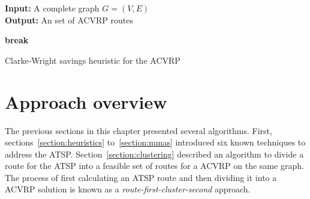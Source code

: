 \begin{algorithm}
  \textbf{Input:} A complete graph $G=(V,E)$ \\
  \textbf{Output:} An set of ACVRP routes
  \begin{algorithmic}[1]

      \ENDFOR
    \ENDFOR


          \ENDIF
        \ENDIF
      \ELSE
        \item \textbf{break}
      \ENDIF
    \ENDFOR

        \ENDWHILE
      \ENDIF
    \ENDFOR

  \end{algorithmic}
  \caption{Clarke-Wright savings heuristic for the ACVRP}
  \label{algorithm:savings}
\end{algorithm}

\newpage
\section{Approach overview}
\label{section:overview}

The previous sections in this chapter presented several algorithms. First,
sections~\ref{section:heuristics} to~\ref{section:mmas} introduced six known
techniques to address the ATSP. Section~\ref{section:clustering} described an
algorithm to divide a route for the ATSP into a feasible set of routes for a
ACVRP on the same graph. The process of first calculating an ATSP route and then
dividing it into a ACVRP solution is known as a
\textit{route-first-cluster-second} approach.

